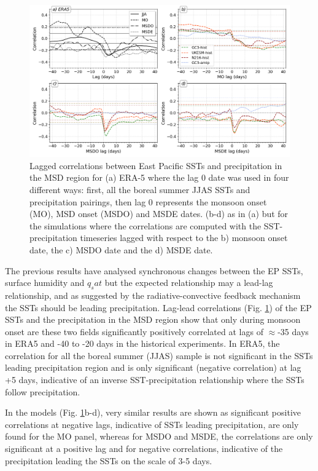 \begin{figure}[t!]
\includegraphics[width=\linewidth]{figures/sst_regg.png}
\caption[Lagged correlations of East Pacific SSTs]{Lagged correlations between East Pacific SSTs and precipitation in the MSD region for (a) ERA-5 where the lag 0 date was used in four different ways: first, all the boreal summer JJAS SSTs and precipitation pairings, then lag 0 represents the monsoon onset (MO), MSD onset (MSDO) and MSDE dates. (b-d) as in (a) but for the simulations where the correlations are computed with the SST-precipitation timeseries lagged with respect to the b) monsoon onset date, the c) MSDO date and the d) MSDE date.   }
\label{fig:sst_lag}
\end{figure}

The previous results have analysed synchronous changes between the EP SSTs, surface humidity and $q_sat$ but the expected relationship may a lead-lag relationship, and as suggested by the radiative-convective feedback mechanism the SSTs should be leading precipitation. 
Lag-lead correlations (Fig. \ref{fig:sst_lag}) of the EP SSTs and the precipitation in the MSD region show that only during monsoon onset are these two fields significantly positively correlated at lags of $\approx$-35 days in ERA5 and -40 to -20 days in the historical experiments. In ERA5, the correlation for all the boreal summer (JJAS) sample is not significant in the SSTs leading  precipitation region and is only significant (negative correlation) at lag +5 days, indicative of an inverse SST-precipitation relationship where the SSTs follow precipitation. 

In the models (Fig. \ref{fig:sst_lag}b-d), very similar results are shown as significant positive correlations at negative lags, indicative of SSTs leading precipitation, are only found for the MO panel, whereas for MSDO and MSDE, the correlations are only significant at a positive lag and for negative correlations, indicative of the precipitation leading the SSTs on the scale of 3-5 days.


